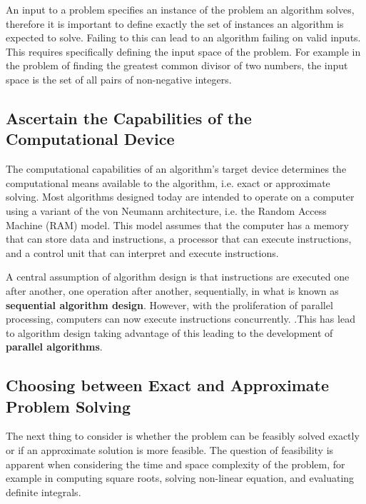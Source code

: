 \documentclass[12pt letter]{report}
\begin{document}
An input to a problem specifies an instance of the problem an algorithm solves, therefore it is important to define
exactly the set of instances an algorithm is expected to solve. Failing to this can lead to an algorithm failing on
valid inputs. This requires specifically defining the input space of the problem. For example in the problem of finding
the greatest common divisor of two numbers, the input space is the set of all pairs of non-negative integers.

\subsection{Ascertain the Capabilities of the Computational Device}

The computational capabilities of an algorithm's target device determines the computational means available to the
algorithm, i.e. exact or approximate solving. Most algorithms designed today are intended to operate on a computer
using a variant of the von Neumann architecture, i.e. the Random Access Machine (RAM) model. This model assumes that
the computer has a memory that can store data and instructions, a processor that can execute instructions, and a control
unit that can interpret and execute instructions.

A central assumption of algorithm design is that instructions are executed one after another, one operation after
another, sequentially, in what is known as \textbf{sequential algorithm design}. However, with the proliferation of parallel
processing, computers can now execute instructions concurrently. .This has lead to algorithm design taking advantage of
this leading to the development of \textbf{parallel algorithms}.

\subsection{Choosing between Exact and Approximate Problem Solving}



The next thing to consider is whether the problem can be feasibly solved exactly or if an approximate solution is more
feasible. The question of feasibility is apparent when considering the time and space complexity of the problem, for
example in computing square roots, solving non-linear equation, and evaluating definite integrals.
\end{document}
